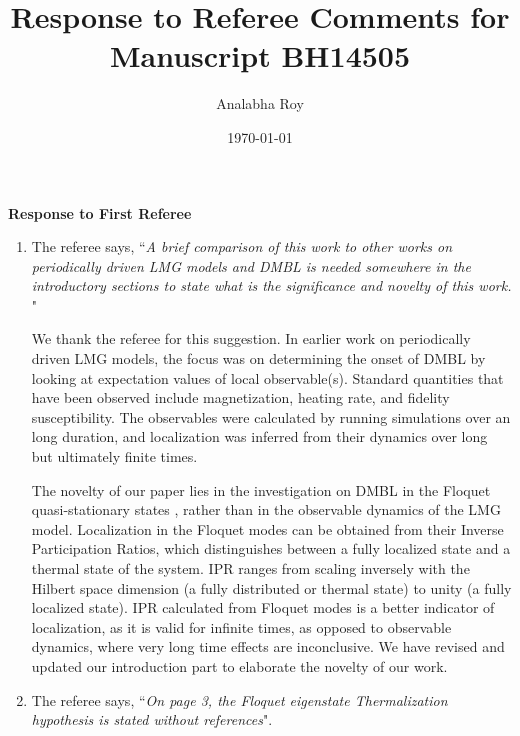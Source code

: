 \documentclass[aps,prb,reprint,showpacs,floatfix,superscriptaddress, onecolumn, nofootinbib, 9pt]{revtex4-2}
\newcommand{\response}[1]{{\color{black}#1}} %
\newcommand{\comment}[1]{{\color{blue}#1}} %
\begin{document}
	
	\title{Response to Referee Comments for Manuscript BH14505}
	\author{Analabha Roy}
	\date{\today}
	
	\maketitle
	
	\vspace{1em}
	
	\noindent \textbf{Response to First Referee}
	
	\begin{enumerate}
		\item The referee says, \comment{``\textit{A brief comparison of this work to other works on periodically driven LMG models and DMBL is needed somewhere in the introductory sections to state what is the significance and novelty of this work. }"}\\
		
		\response{
			We thank the referee for this suggestion. In earlier work on periodically driven LMG models,
			the focus was on determining the onset of DMBL by looking at expectation values of local
			observable(s). Standard quantities that have been observed include magnetization, heating rate, and fidelity susceptibility. The observables were calculated by running simulations over an long duration, and localization was inferred from their dynamics over long but ultimately finite times.
			
			The novelty of our paper lies in the investigation on DMBL in the Floquet quasi-stationary states , rather than in the observable dynamics of the LMG model. Localization in the Floquet modes can be obtained from their Inverse Participation Ratios, which distinguishes between a fully localized state and a thermal state of the system. IPR ranges from scaling inversely with the Hilbert space dimension (a fully distributed or thermal state) to unity (a fully localized state). IPR calculated from Floquet modes is a better indicator of localization, as it is valid for infinite times, as opposed to observable dynamics, where very long time effects are inconclusive. We have revised and updated our introduction part to elaborate the novelty of our work.
		


}
		\item The referee says, \comment{``\textit{On page 3, the Floquet eigenstate Thermalization hypothesis is stated without references}".}\\
		

\end{enumerate}
\end{document}
